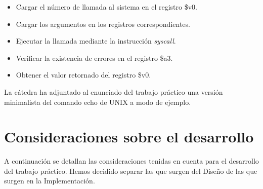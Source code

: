 \documentclass[a4paper,10pt]{article}
\begin{document}
\begin{itemize}
\item 
Cargar el n\'umero de llamada al sistema en el registro \$v0.
\item
Cargar los argumentos en los registros correspondientes. 
\item
Ejecutar la llamada mediante la instrucci\'on \textit{syscall}.
\item
Verificar la existencia de errores en el registro \$a3.
\item
Obtener el valor retornado del registro \$v0.
\end{itemize}

La c\'atedra ha adjuntado al enunciado del trabajo pr\'actico una versi\'on minimalista del comando echo de UNIX a modo de ejemplo.

\pagebreak

\section{Consideraciones sobre el desarrollo}
A continuaci\'on se detallan las consideraciones tenidas en cuenta para el desarrollo del trabajo pr\'actico. Hemos decidido separar las que surgen del Dise\~no de las que surgen en la Implementaci\'on.
\end{document}

